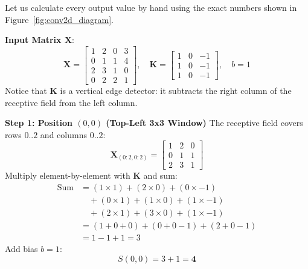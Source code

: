 \begin{example}
Let us calculate every output value by hand using the exact numbers shown in Figure~\ref{fig:conv2d_diagram}.

\textbf{Input Matrix $\mathbf{X}$}:
\begin{equation*}
\mathbf{X} = \begin{bmatrix}
1 & 2 & 0 & 3 \\
0 & 1 & 1 & 4 \\
2 & 3 & 1 & 0 \\
0 & 2 & 2 & 1
\end{bmatrix}, \quad
\mathbf{K} = \begin{bmatrix}
1 & 0 & -1 \\
1 & 0 & -1 \\
1 & 0 & -1
\end{bmatrix}, \quad
b = 1
\end{equation*}
Notice that $\mathbf{K}$ is a vertical edge detector: it subtracts the right column of the receptive field from the left column.

\textbf{Step 1: Position $(0, 0)$ (Top-Left 3x3 Window)}
The receptive field covers rows $0..2$ and columns $0..2$:
\begin{equation*}
\mathbf{X}_{(0:2, 0:2)} = \begin{bmatrix}
1 & 2 & 0 \\
0 & 1 & 1 \\
2 & 3 & 1
\end{bmatrix}
\end{equation*}
Multiply element-by-element with $\mathbf{K}$ and sum:
\begin{align*}
\text{Sum} &= (1 \times 1) + (2 \times 0) + (0 \times -1) \\
           &\quad + (0 \times 1) + (1 \times 0) + (1 \times -1) \\
           &\quad + (2 \times 1) + (3 \times 0) + (1 \times -1) \\
           &= (1 + 0 + 0) + (0 + 0 - 1) + (2 + 0 - 1) \\
           &= 1 - 1 + 1 = 3
\end{align*}
Add bias $b = 1$:
\begin{equation*}
S(0, 0) = 3 + 1 = \mathbf{4}
\end{equation*}


\end{example}
